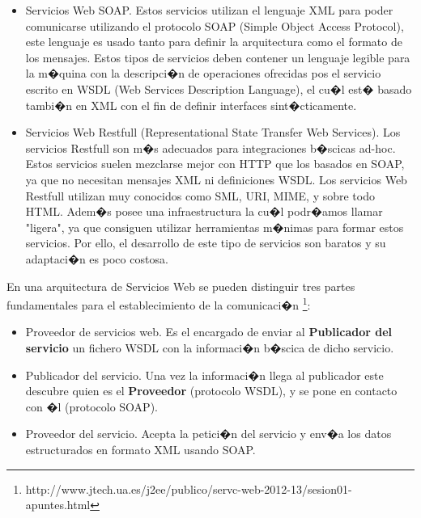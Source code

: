 \begin{itemize}
 \item Servicios Web SOAP. Estos servicios utilizan el lenguaje XML para poder comunicarse utilizando el protocolo SOAP (Simple Object Access Protocol), este lenguaje es usado tanto para definir la arquitectura como el formato de los mensajes. Estos tipos de servicios deben contener un lenguaje legible para la m�quina con la descripci�n de operaciones ofrecidas pos el servicio escrito en WSDL (Web Services Description Language), el cu�l est� basado tambi�n en XML con el fin de definir interfaces sint�cticamente.
 
  \item Servicios Web Restfull (Representational State Transfer Web Services). Los  servicios Restfull son m�s adecuados para integraciones b�scicas ad-hoc. Estos servicios suelen mezclarse mejor con HTTP que los basados en SOAP, ya que no necesitan mensajes XML ni definiciones WSDL.
  Los servicios Web Restfull utilizan muy conocidos como SML, URI, MIME, y sobre todo HTML. Adem�s posee una infraestructura la cu�l podr�amos llamar "ligera", ya que consiguen utilizar herramientas m�nimas para formar estos servicios. Por ello, el desarrollo de este tipo de servicios son baratos y su adaptaci�n es poco costosa.  
\end{itemize}

En una arquitectura de Servicios Web se pueden distinguir tres partes fundamentales para el establecimiento de la comunicaci�n \footnote{http://www.jtech.ua.es/j2ee/publico/servc-web-2012-13/sesion01-apuntes.html}: 

\begin{itemize}
  \item Proveedor de servicios web. Es el encargado de enviar al \textbf{Publicador del servicio} un fichero WSDL con la informaci�n b�scica de dicho servicio.
   \item Publicador del servicio. Una vez la informaci�n llega al publicador este descubre quien es el \textbf{Proveedor} (protocolo WSDL), y se pone en contacto con �l (protocolo SOAP).
   \item Proveedor del servicio. Acepta la petici�n del servicio y env�a los datos estructurados en formato XML usando SOAP.  
\end{itemize}

